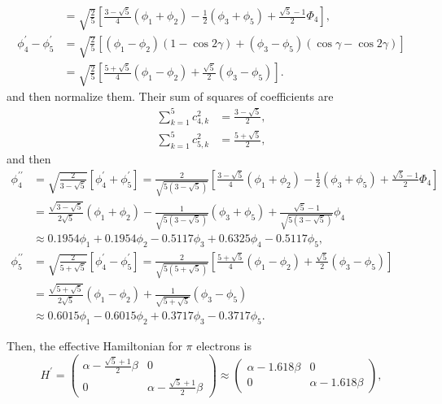 \documentclass[a4paper]{book}
\begin{document}
\begin{solution}
\begin{enumerate}[label=(\alph*)]
\begin{align*}
			&= \sqrt{ \frac{2}{5} } \left[ \frac{3-\sqrt{5}}{4}(\phi_1 + \phi_2) - \frac{1}{2} (\phi_3 + \phi_5) + \frac{ \sqrt{5}-1 }{2} \Phi_4 \right] , \\
			\phi^\prime_4 - \phi^\prime_5 &= \sqrt{ \frac{2}{5} } \left[ (\phi_1-\phi_2) (1-\cos2\gamma) + (\phi_3-\phi_5) (\cos\gamma - \cos2\gamma) \right] \\
			&=\sqrt{ \frac{2}{5} } \left[ \frac{ 5+\sqrt{5} }{4} (\phi_1 - \phi_2) + \frac{ \sqrt{5} }{2} (\phi_3 - \phi_5) \right].
		\end{align*}
		and then normalize them. Their sum of squares of coefficients are
		\begin{align*}
			\sum_{k=1}^5 c^2_{4,k} &= \frac{3-\sqrt{5}}{2}, \\
			\sum_{k=1}^5 c^2_{5,k} &= \frac{5+\sqrt{5}}{2},
		\end{align*}
		and then
		\begin{align*}
			\phi^{\prime\prime}_4 &= \sqrt{ \frac{2}{3-\sqrt{5}} } \left[ \phi^\prime_4 + \phi^\prime_5 \right] = \frac{2}{ \sqrt{5(3-\sqrt{5})} } \left[ \frac{3-\sqrt{5}}{4}(\phi_1 + \phi_2) - \frac{1}{2} (\phi_3 + \phi_5) + \frac{ \sqrt{5}-1 }{2} \Phi_4 \right]\\
			&= \frac{ \sqrt{3-\sqrt{5}} }{2\sqrt{5}}(\phi_1 + \phi_2) - \frac{1}{ \sqrt{ 5(3-\sqrt{5}) } } (\phi_3 + \phi_5) + \frac{ \sqrt{5}-1 }{ \sqrt{ 5(3-\sqrt{5}) } } \phi_4 \\
			&\approx 0.1954 \phi_1 + 0.1954 \phi_2 - 0.5117 \phi_3 +0.6325\phi_4 -0.5117 \phi_5 , \\
			\phi^{\prime\prime}_5 &= \sqrt{ \frac{2}{5+\sqrt{5}} } \left[ \phi^\prime_4 - \phi^\prime_5 \right] = \frac{2}{ \sqrt{5(5+\sqrt{5})} }\left[ \frac{ 5+\sqrt{5} }{4} (\phi_1 - \phi_2) + \frac{ \sqrt{5} }{2} (\phi_3 - \phi_5) \right] \\
			&= \frac{ \sqrt{ 5+\sqrt{5} } }{ 2\sqrt{5} } (\phi_1 - \phi_2) + \frac{ 1 }{ \sqrt{ 5+\sqrt{5} } }(\phi_3 - \phi_5) \\
			&\approx 0.6015 \phi_1 - 0.6015 \phi_2 + 0.3717\phi_3 -0.3717 \phi_5.
		\end{align*}
		
		Then, the effective Hamiltonian for $\pi$ electrons is
		\begin{equation*}
			H^\prime = \begin{pmatrix}
				\alpha - \frac{ \sqrt{5}+1 }{2}\beta & 0 \\
				0 & \alpha - \frac{ \sqrt{5}+1 }{2}\beta
			\end{pmatrix} \approx
			\begin{pmatrix}
				\alpha - 1.618 \beta & 0 \\ 0 & \alpha - 1.618 \beta
			\end{pmatrix}				,
		\end{equation*}
		

\end{enumerate}
\end{solution}
\end{document}
